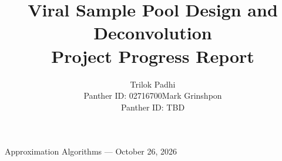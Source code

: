 \documentclass{article}
\title{Viral Sample Pool Design and Deconvolution\\Project Progress Report}
\author{Trilok Padhi\\Panther ID: 02716700\And Mark Grinshpon\\Panther ID: TBD}
\begin{document}
\maketitle
\begin{center}\small Approximation Algorithms --- October 26, 2026\end{center}

\end{document}
